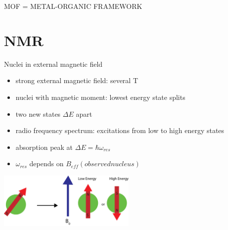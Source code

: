 \documentclass[slovene, usenames,dvipsnames]{beamer}
\begin{document}
\begin{frame}{MOF = METAL-ORGANIC FRAMEWORK }
\begin{minipage}[]{0.5\textwidth}
\begin{minipage}[]{\textwidth}
    \end{minipage}
  \end{minipage}  
\end{frame}

\section{NMR}
\begin{frame}{Nuclei in external magnetic field}
  \begin{itemize}[]
   \item strong external magnetic field: several T
  \item nuclei with magnetic moment: lowest energy state splits
    \item two new states $\Delta E$ apart
   \item radio frequency spectrum: excitations from low to high energy states
   \item absorption peak at $\Delta E=\hbar \omega_{res}$
    \item $\omega_{res}$ depends on $B_{eff}(observed nucleus)$
    \end{itemize}
       \begin{minipage}[]{\textwidth}
      \centering
    \includegraphics[width=0.5\textwidth]{spin_energy_states.png}
\end{minipage}
\end{frame}
\end{document}
